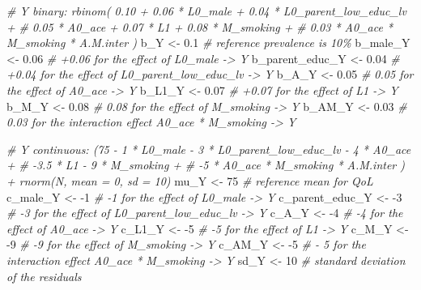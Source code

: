 \documentclass[
]{book}
\newenvironment{Shaded}{\begin{snugshade}}{\end{snugshade}}
\newcommand{\CommentTok}[1]{\textcolor[rgb]{0.56,0.35,0.01}{\textit{#1}}}
\newcommand{\DecValTok}[1]{\textcolor[rgb]{0.00,0.00,0.81}{#1}}
\newcommand{\FloatTok}[1]{\textcolor[rgb]{0.00,0.00,0.81}{#1}}
\newcommand{\NormalTok}[1]{#1}
\newcommand{\OtherTok}[1]{\textcolor[rgb]{0.56,0.35,0.01}{#1}}
\newcommand{\SpecialCharTok}[1]{\textcolor[rgb]{0.00,0.00,0.00}{#1}}
\begin{document}
\begin{Shaded}
\begin{Highlighting}[]
\CommentTok{\# Y binary: rbinom( 0.10 + 0.06 * L0\_male + 0.04 * L0\_parent\_low\_educ\_lv + }
\CommentTok{\#                   0.05 * A0\_ace + 0.07 * L1 + 0.08 * M\_smoking +}
\CommentTok{\#                   0.03 * A0\_ace * M\_smoking * A.M.inter ) }
\NormalTok{b\_Y }\OtherTok{\textless{}{-}} \FloatTok{0.1} \CommentTok{\# reference prevalence is 10\%}
\NormalTok{b\_male\_Y }\OtherTok{\textless{}{-}} \FloatTok{0.06} \CommentTok{\# +0.06 for the effect of L0\_male {-}\textgreater{} Y}
\NormalTok{b\_parent\_educ\_Y }\OtherTok{\textless{}{-}} \FloatTok{0.04} \CommentTok{\# +0.04 for the effect of L0\_parent\_low\_educ\_lv {-}\textgreater{} Y}
\NormalTok{b\_A\_Y }\OtherTok{\textless{}{-}} \FloatTok{0.05} \CommentTok{\# 0.05 for the effect of A0\_ace {-}\textgreater{} Y}
\NormalTok{b\_L1\_Y }\OtherTok{\textless{}{-}} \FloatTok{0.07} \CommentTok{\# +0.07 for the effect of L1 {-}\textgreater{} Y}
\NormalTok{b\_M\_Y }\OtherTok{\textless{}{-}} \FloatTok{0.08} \CommentTok{\# 0.08 for the effect of M\_smoking {-}\textgreater{} Y}
\NormalTok{b\_AM\_Y }\OtherTok{\textless{}{-}} \FloatTok{0.03} \CommentTok{\# 0.03 for the interaction effect A0\_ace * M\_smoking {-}\textgreater{} Y}

\CommentTok{\# Y continuous: (75 {-} 1 * L0\_male {-} 3 * L0\_parent\_low\_educ\_lv {-} 4 * A0\_ace +}
\CommentTok{\#                {-}3.5 * L1 {-} 9 * M\_smoking + }
\CommentTok{\#                {-}5 * A0\_ace * M\_smoking * A.M.inter ) + rnorm(N, mean = 0, sd = 10)}
\NormalTok{mu\_Y }\OtherTok{\textless{}{-}} \DecValTok{75} \CommentTok{\# reference mean for QoL}
\NormalTok{c\_male\_Y }\OtherTok{\textless{}{-}} \SpecialCharTok{{-}}\DecValTok{1} \CommentTok{\# {-}1 for the effect of L0\_male {-}\textgreater{} Y}
\NormalTok{c\_parent\_educ\_Y }\OtherTok{\textless{}{-}} \SpecialCharTok{{-}}\DecValTok{3} \CommentTok{\# {-}3 for the effect of L0\_parent\_low\_educ\_lv {-}\textgreater{} Y}
\NormalTok{c\_A\_Y }\OtherTok{\textless{}{-}} \SpecialCharTok{{-}}\DecValTok{4} \CommentTok{\# {-}4 for the effect of A0\_ace {-}\textgreater{} Y}
\NormalTok{c\_L1\_Y }\OtherTok{\textless{}{-}} \SpecialCharTok{{-}}\DecValTok{5} \CommentTok{\# {-}5 for the effect of L1 {-}\textgreater{} Y}
\NormalTok{c\_M\_Y }\OtherTok{\textless{}{-}} \SpecialCharTok{{-}}\DecValTok{9} \CommentTok{\# {-}9 for the effect of M\_smoking {-}\textgreater{} Y}
\NormalTok{c\_AM\_Y }\OtherTok{\textless{}{-}} \SpecialCharTok{{-}}\DecValTok{5}  \CommentTok{\# {-} 5 for the interaction effect A0\_ace * M\_smoking  {-}\textgreater{} Y}
\NormalTok{sd\_Y }\OtherTok{\textless{}{-}} \DecValTok{10} \CommentTok{\# standard deviation of the residuals}


\end{Highlighting}
\end{Shaded}
\end{document}
